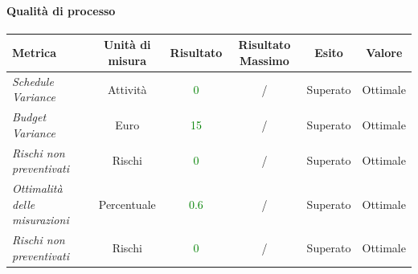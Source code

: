 \paragraph{Qualità di processo}
\begin{longtable}{|>{\centering}m{5cm}|c|c|c|c|c|}
\hline
\textbf{Metrica} & \textbf{Unità di misura} & \textbf{Risultato} & \textbf{Risultato Massimo} & \textbf{Esito} & \textbf{Valore}\\
\hline
\endhead

\emph{Schedule Variance} & {Attività} & \textcolor{Green}{0} & / & Superato & Ottimale\\ \hline
\emph{Budget Variance} & {Euro} & \textcolor{Green}{15} & / & Superato & Ottimale \\ \hline
\emph{Rischi non preventivati} & {Rischi} & \textcolor{Green}{0} & / & Superato & Ottimale\\ \hline
\emph{Ottimalità delle misurazioni} & {Percentuale} & \textcolor{Green}{0.6} & / & Superato & Ottimale \\ \hline
\emph{Rischi non preventivati} & {Rischi} & \textcolor{Green}{0} & / & Superato & Ottimale\\ \hline

\end{longtable}
